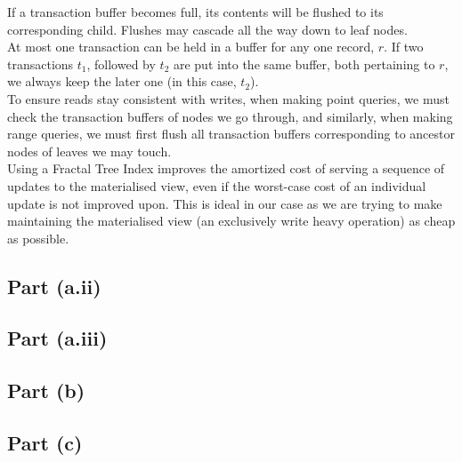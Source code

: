 If a transaction buffer becomes full, its contents will be flushed to its corresponding child. Flushes may cascade all the way down to leaf nodes.\\[1em]

At most one transaction can be held in a buffer for any one record, $r$. If two transactions $t_1$, followed by $t_2$ are put into the same buffer, both pertaining to $r$, we always keep the later one (in this case, $t_2$).\\[1em]

To ensure reads stay consistent with writes, when making point queries, we must check the transaction buffers of nodes we go through, and similarly, when making range queries, we must first flush all transaction buffers corresponding to ancestor nodes of leaves we may touch.\\[1em]

Using a Fractal Tree Index improves the amortized cost of serving a sequence of updates to the materialised view, even if the worst-case cost of an individual update is not improved upon. This is ideal in our case as we are trying to make maintaining the materialised view (an exclusively write heavy operation) as cheap as possible.

\subsection{Part (a.ii)}\label{sec:q-1-a-ii}
\subsection{Part (a.iii)}\label{sec:q-1-a-iii}
\subsection{Part (b)}\label{sec:q-1-b}
\subsection{Part (c)}\label{sec:q-1-c}
